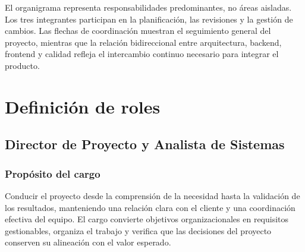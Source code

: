 El organigrama representa responsabilidades predominantes, no áreas aisladas. Los
tres integrantes participan en la planificación, las revisiones y la gestión de
cambios. Las flechas de coordinación muestran el seguimiento general del
proyecto, mientras que la relación bidireccional entre arquitectura, backend,
frontend y calidad refleja el intercambio continuo necesario para integrar el
producto.

\section{Definición de roles}

\subsection{Director de Proyecto y Analista de Sistemas}

\begin{nota}
\lgDirector
\end{nota}

\subsubsection{Propósito del cargo}

Conducir el proyecto desde la comprensión de la necesidad hasta la validación de
los resultados, manteniendo una relación clara con el cliente y una coordinación
efectiva del equipo. El cargo convierte objetivos organizacionales en requisitos
gestionables, organiza el trabajo y verifica que las decisiones del proyecto
conserven su alineación con el valor esperado.

